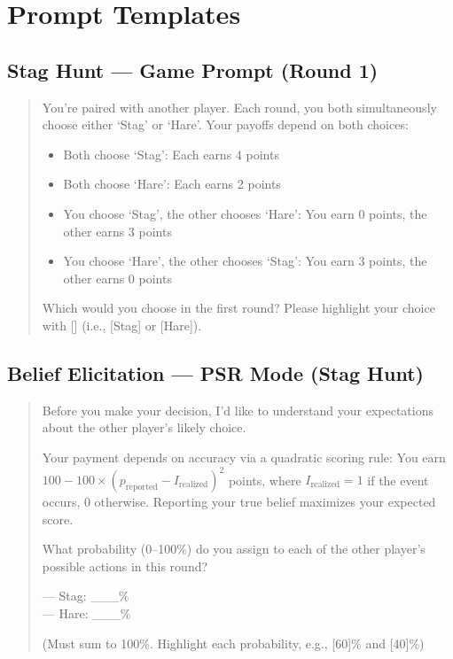\documentclass[12pt]{article}
\begin{document}
\section{Prompt Templates}
\label{app:prompts}

\subsection{Stag Hunt --- Game Prompt (Round 1)}

\begin{quote}
\small
You're paired with another player. Each round, you both simultaneously choose either `Stag' or `Hare'. Your payoffs depend on both choices:

\begin{itemize}[nosep]
    \item Both choose `Stag': Each earns 4 points
    \item Both choose `Hare': Each earns 2 points
    \item You choose `Stag', the other chooses `Hare': You earn 0 points, the other earns 3 points
    \item You choose `Hare', the other chooses `Stag': You earn 3 points, the other earns 0 points
\end{itemize}

Which would you choose in the first round? Please highlight your choice with [] (i.e., [Stag] or [Hare]).
\end{quote}

\subsection{Belief Elicitation --- PSR Mode (Stag Hunt)}

\begin{quote}
\small
Before you make your decision, I'd like to understand your expectations about the other player's likely choice.

Your payment depends on accuracy via a quadratic scoring rule: You earn $100 - 100 \times (p_{\text{reported}} - I_{\text{realized}})^2$ points, where $I_{\text{realized}} = 1$ if the event occurs, 0 otherwise. Reporting your true belief maximizes your expected score.

What probability (0--100\%) do you assign to each of the other player's possible actions in this round?

--- Stag: \_\_\_\%\\
--- Hare: \_\_\_\%

(Must sum to 100\%. Highlight each probability, e.g., [60]\% and [40]\%)
\end{quote}
\end{document}
